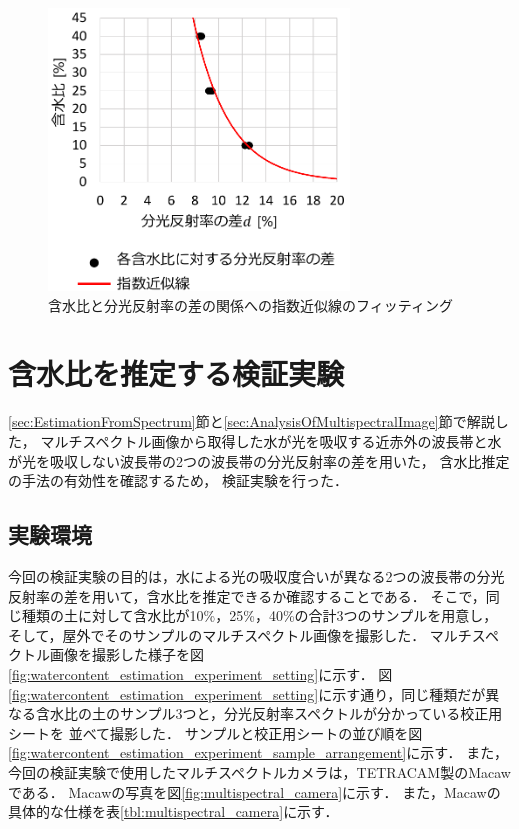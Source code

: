 \begin{figure}[p]
	\begin{center}
	\centering
	\includegraphics[width=8cm]{./Ch4_WaterContentEstimation/Fig/model_fitting_compressed.pdf}
	\caption{含水比と分光反射率の差の関係への指数近似線のフィッティング}\label{fig:model_fitting}
	\vspace{0.5cm}
	\end{center}
\end{figure}

\clearpage


\section{含水比を推定する検証実験}
\label{sec:PreliminaryExperimentOfEstimation}

\ref{sec:EstimationFromSpectrum}節と\ref{sec:AnalysisOfMultispectralImage}節で解説した，
マルチスペクトル画像から取得した水が光を吸収する近赤外の波長帯と水が光を吸収しない波長帯の2つの波長帯の分光反射率の差を用いた，
含水比推定の手法の有効性を確認するため，
検証実験を行った．

\subsection{実験環境}
\label{ssec:EstimationExperimentSetting}

今回の検証実験の目的は，水による光の吸収度合いが異なる2つの波長帯の分光反射率の差を用いて，含水比を推定できるか確認することである．
そこで，同じ種類の土に対して含水比が10\%，25\%，40\%の合計3つのサンプルを用意し，
そして，屋外でそのサンプルのマルチスペクトル画像を撮影した．
マルチスペクトル画像を撮影した様子を図\ref{fig:watercontent_estimation_experiment_setting}に示す．
図\ref{fig:watercontent_estimation_experiment_setting}に示す通り，同じ種類だが異なる含水比の土のサンプル3つと，分光反射率スペクトルが分かっている校正用シートを
並べて撮影した．
サンプルと校正用シートの並び順を図\ref{fig:watercontent_estimation_experiment_sample_arrangement}に示す．
また，今回の検証実験で使用したマルチスペクトルカメラは，TETRACAM製のMacawである．
Macawの写真を図\ref{fig:multispectral_camera}に示す．
また，Macawの具体的な仕様を表\ref{tbl:multispectral_camera}に示す．

